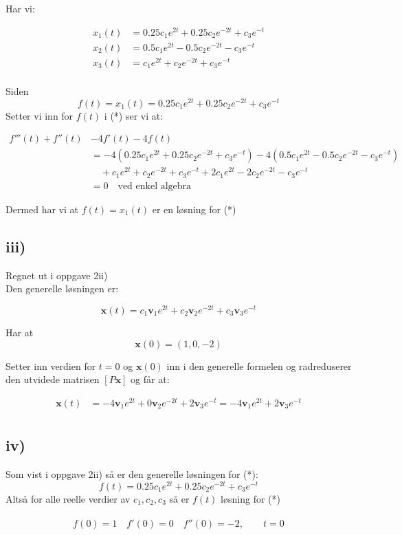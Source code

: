\documentclass[a4paper, norsk, twoside, 10pt]{article}
\begin{document}
\begin{flushleft}
  Har vi:

  \begin{align*}
    x_{1}(t) &= 0.25c_{1}e^{2t} + 0.25c_{2}e^{-2t} + c_{3}e^{-t} \\
    x_{2}(t) &= 0.5c_{1}e^{2t} - 0.5c_{2}e^{-2t} - c_{3}e^{-t} \\
    x_{3}(t) &=c_{1}e^{2t} + c_{2}e^{-2t} + c_{3}e^{-t} \\
  \end{align*}

  Siden \[f(t) = x_{1}(t)  =0.25c_{1}e^{2t} + 0.25c_{2}e^{-2t} + c_{3}e^{-t}  \]
  Setter vi inn for $f(t)$ i (*) ser vi at:

  \begin{align*}
    f'''(t) +f''(t) &-4f'(t) -4f(t) \\&= -4(0.25c_{1}e^{2t} + 0.25c_{2}e^{-2t} + c_{3}e^{-t}) -4(0.5c_{1}e^{2t} - 0.5c_{2}e^{-2t} - c_{3}e^{-t} )\\ &\quad+ c_{1}e^{2t} + c_{2}e^{-2t} + c_{3}e^{-t} + 2c_{1}e^{2t}  -2c_{2}e^{-2t} - c_{3}e^{-t} \\
    &= 0 \quad \text{ved enkel algebra}
  \end{align*}

  Dermed har vi at $f(t) = x_{1}(t)$ er en løsning for (*)


  \subsection*{iii)}

  Regnet ut i oppgave 2ii)\\ Den generelle løsningen er:

  \[\mathbf{x}(t) = c_{1}\mathbf{v}_{1}e^{2t} + c_{2}\mathbf{v}_{2}e^{-2t} + c_{3}\mathbf{v}_{3}e^{-t} \]


  Har at \[\mathbf{x}(0) = (1 , 0 , -2)\]

  Setter inn verdien for $t = 0$ og $\mathbf{x}(0)$ inn i den generelle formelen og radreduserer den utvidede matrisen $[P \mathbf{x}]$ og får at:

  \begin{align*}
    \mathbf{x}(t) &= -4\mathbf{v}_{1}e^{2t} +0\mathbf{v}_{2}e^{-2t} + 2\mathbf{v}_{3}e^{-t}  = -4\mathbf{v}_{1}e^{2t}  + 2\mathbf{v}_{3}e^{-t} \\
  \end{align*}




  \subsection*{iv)}
  Som vist i oppgave 2ii) så er den generelle løsningen for (*):
  \[f(t) = 0.25c_{1}e^{2t} + 0.25c_{2}e^{-2t} + c_{3}e^{-t} \]
  Altså for alle reelle verdier av $c_{1}, c_{2}, c_{3}$ så er $f(t)$ løsning for (*)
  \\
  \ \\
  \[f(0) = 1 \quad f'(0) = 0 \quad f''(0) = -2, \qquad t = 0\]


\end{flushleft}
\end{document}
